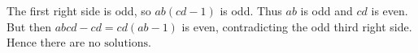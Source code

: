 The first right side is odd, so $ab(cd-1)$ is odd. Thus $ab$ is odd and $cd$ is even. But then $abcd-cd=cd(ab-1)$ is even, contradicting the odd third right side. Hence there are $\boxed{\text{no solutions}}$.
